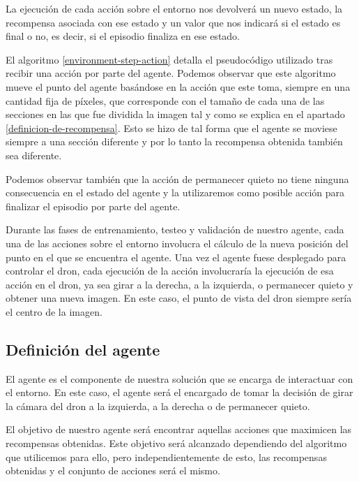 La ejecución de cada acción sobre el entorno nos devolverá un nuevo estado, la recompensa asociada con ese estado y un valor que nos indicará si el estado es final o no, es decir, si el episodio finaliza en ese estado. 
\medskip

El algoritmo \ref{environment-step-action} detalla el pseudocódigo utilizado tras recibir una acción por parte del agente. Podemos observar que este algoritmo mueve el punto del agente basándose en la acción que este toma, siempre en una cantidad fija de píxeles, que corresponde con el tamaño de cada una de las secciones en las que fue dividida la imagen tal y como se explica en el apartado \ref{definicion-de-recompensa}. Esto se hizo de tal forma que el agente se moviese siempre a una sección diferente y por lo tanto la recompensa obtenida también sea diferente.
\medskip



Podemos observar también que la acción de permanecer quieto no tiene ninguna consecuencia en el estado del agente y la utilizaremos como posible acción para finalizar el episodio por parte del agente.
\medskip

Durante las fases de entrenamiento, testeo y validación de nuestro agente, cada una de las acciones sobre el entorno involucra el cálculo de la nueva posición del punto en el que se encuentra el agente. Una vez el agente fuese desplegado para controlar el dron, cada ejecución de la acción involucraría la ejecución de esa acción en el dron, ya sea girar a la derecha, a la izquierda, o permanecer quieto y obtener una nueva imagen. En este caso, el punto de vista del dron siempre sería el centro de la imagen.
\medskip

\subsection{Definición del agente}
\label{definicion-del-agente}

El agente es el componente de nuestra solución que se encarga de interactuar con el entorno. En este caso, el agente será el encargado de tomar la decisión de girar la cámara del dron a la izquierda, a la derecha o de permanecer quieto.
\medskip

El objetivo de nuestro agente será encontrar aquellas acciones que maximicen las recompensas obtenidas. Este objetivo será alcanzado dependiendo del algoritmo que utilicemos para ello, pero independientemente de esto, las recompensas obtenidas y el conjunto de acciones será el mismo.
\medskip


